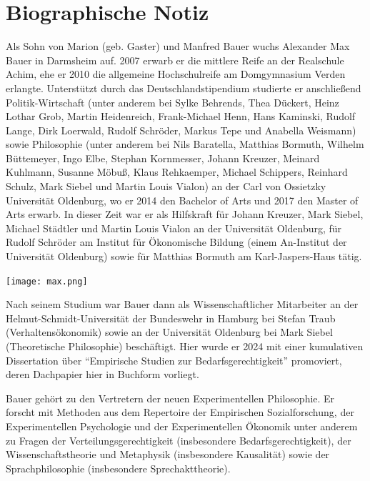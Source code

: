 \documentclass[justified,nobib,nohyper,symmetric,twoside]{tufte-book}
\begin{document}
\cleardoublepage
\chapter*{Biographische Notiz}
Als Sohn von Marion (geb. Gaster) und Manfred Bauer wuchs \mbox{Alexander} Max Bauer in Darmsheim auf.
2007 erwarb er die mittlere Reife an der Realschule Achim, ehe er 2010 die allgemeine Hochschulreife am Domgymnasium Verden erlangte.
Unterstützt durch das Deutschlandstipendium studierte er anschließend Politik-Wirtschaft (unter anderem bei Sylke Behrends, Thea Dückert, Heinz Lothar Grob, Martin Heidenreich, Frank-Michael Henn, Hans Kaminski, Rudolf Lange, Dirk Loerwald, Rudolf Schröder, Markus Tepe und Anabella Weismann) sowie Philosophie (unter anderem bei Nils Baratella, Matthias Bormuth, Wilhelm Büttemeyer, Ingo Elbe, Stephan Kornmesser, Johann Kreuzer, Meinard Kuhlmann, Susanne Möbuß, Klaus Rehkaemper, Michael Schippers, Reinhard Schulz, Mark Siebel und Martin Louis Vialon) an der Carl von Ossietzky Universität Oldenburg, wo er 2014 den Bachelor of Arts und 2017 den Master of Arts erwarb.
In dieser Zeit war er als Hilfskraft für Johann Kreuzer, Mark Siebel, Michael Städtler und Martin Louis \mbox{Vialon} an der Universität Oldenburg, für Rudolf Schröder am Institut für Ökonomische Bildung (einem An-Institut der Universität Oldenburg) sowie für Matthias Bormuth am Karl-Jaspers-Haus tätig.

\begin{marginfigure}[-200pt]
   \texttt{[image: max.png]}
\end{marginfigure}


Nach seinem Studium war Bauer dann als Wissenschaftlicher Mitarbeiter an der Helmut-Schmidt-Universität der Bundeswehr in Hamburg bei Stefan Traub (Verhaltensökonomik) sowie an der Universität Oldenburg bei Mark Siebel (Theoretische Philosophie) beschäftigt.
Hier wurde er 2024 mit einer kumulativen Dissertation über \enquote{Empirische Studien zur Bedarfsgerechtigkeit} promoviert, deren Dachpapier hier in Buchform vorliegt.

Bauer gehört zu den Vertretern der neuen Experimentellen Philosophie.
Er forscht mit Methoden aus dem Repertoire der Empirischen Sozialforschung, der Experimentellen Psychologie und der Experimentellen Ökonomik unter anderem zu Fragen der Verteilungsgerechtigkeit (insbesondere Bedarfsgerechtigkeit), der Wissenschaftstheorie und Metaphysik (insbesondere Kausalität) sowie der Sprachphilosophie (insbesondere Sprechakttheorie).
\end{document}
